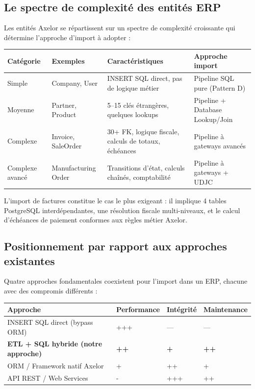 \documentclass[a4paper,12pt]{article}
\begin{document}
\subsection{Le spectre de complexité des entités ERP}

Les entités Axelor se répartissent sur un spectre de complexité croissante qui détermine l'approche d'import à adopter :

\begin{center}
\begin{tabular}{|p{}|p{}|p{}|p{}|}
\hline
\textbf{Catégorie} & \textbf{Exemples} & \textbf{Caractéristiques} & \textbf{Approche import} \\
\hline
Simple & Company, User & INSERT SQL direct, pas de logique métier & Pipeline SQL pure (Pattern D) \\
\hline
Moyenne & Partner, Product & 5--15 clés étrangères, quelques lookups & Pipeline + Database Lookup/Join \\
\hline
Complexe & Invoice, SaleOrder & 30+ FK, logique fiscale, calculs de totaux, échéances & Pipeline à gateways avancés \\
\hline
Complexe avancé & Manufacturing Order & Transitions d'état, calculs chaînés, comptabilité & Pipeline à gateways + UDJC \\
\hline
\end{tabular}
\end{center}

L'import de factures constitue le cas le plus exigeant : il implique 4 tables PostgreSQL interdépendantes, une résolution fiscale multi-niveaux, et le calcul d'échéances de paiement conformes aux règles métier Axelor.

\subsection{Positionnement par rapport aux approches existantes}

Quatre approches fondamentales coexistent pour l'import dans un ERP, chacune avec des compromis différents :

\begin{center}
\begin{tabular}{|p{}|p{}|p{}|p{}|}
\hline
\textbf{Approche} & \textbf{Performance} & \textbf{Intégrité} & \textbf{Maintenance} \\
\hline
INSERT SQL direct (bypass ORM) & +++ & --- & --- \\
\hline
\textbf{ETL + SQL hybride (notre approche)} & \textbf{++} & \textbf{+} & \textbf{++} \\
\hline
ORM / Framework natif Axelor & + & ++ & + \\
\hline
API REST / Web Services & - & +++ & ++ \\
\hline
\end{tabular}
\end{center}
\end{document}
